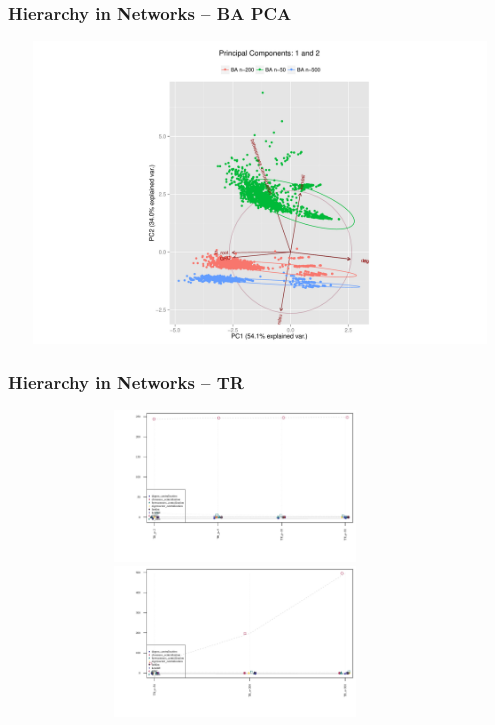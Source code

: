\documentclass[xcolor={table}]{beamer}
\newenvironment{changemargin}[2]{%
  \begin{list}{}{%
    \setlength{\topsep}{0pt}%
    \setlength{\leftmargin}{#1}%
    \setlength{\rightmargin}{#2}%
    \setlength{\listparindent}{\parindent}%
    \setlength{\itemindent}{\parindent}%
    \setlength{\parsep}{\parskip}%
  }%
  \item[]}{\end{list}}
\begin{document}
\begin{frame}\frametitle{Hierarchy in Networks -- BA PCA}
	\begin{changemargin}{-2cm}{ -2cm}
		\centering
		\includegraphics[width=15cm, height=8cm]{images/BA_Size_PCA_Components1_2.pdf}
	\end{changemargin}
\end{frame}

\begin{frame}\frametitle{Hierarchy in Networks -- TR}
	\begin{changemargin}{-2cm}{ -2cm}
		\centering
			\includegraphics[width=12cm, height=4cm]{images/TR_Param_Averages.pdf}
			\\
			\includegraphics[width=12cm, height=4cm]{images/TR_Size_Averages.pdf}
	\end{changemargin}
\end{frame}
\end{document}
